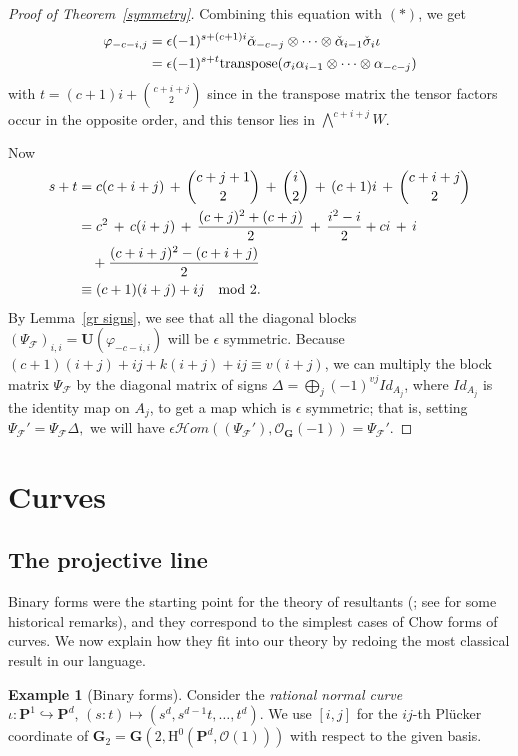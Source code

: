 \documentclass{jams-l}
\theoremstyle{definition}
\newtheorem{example}[theorem]{Example}
\theoremstyle{remark}
\newcommand{\F}{{\mathcal F}}
\newcommand{\GG}{{\mathbf G}}
\newcommand{\Hrm}{{\mathrm H}}
\newcommand{\cH}{{\mathcal H}}
\newcommand{\Ocal}{{\mathcal O}}
\newcommand{\cO}{{\mathcal O}}
\newcommand{\PP}{{\mathbf P}}
\newcommand{\UU}{{\mathbf U}}
\newcommand{\tensor}{\otimes}
\begin{document}
\begin{proof}[Proof of Theorem~\ref{symmetry}]
Combining this equation with $(*)$, we get
\begin{align*}
\varphi_{-c-i,j}
& =\epsilon (-1)^{s+(c+1)i} \check \alpha_{-c-j} \tensor \ldots 
\tensor \check \alpha_{i-1} \check \sigma_i \iota \\
& =\epsilon (-1)^{s+t} {\rm transpose}(\sigma_i \alpha_{i-1} \tensor
\ldots \tensor \alpha_{-c-j}) 
\end{align*}
with $t=(c+1)i+{c+i+j \choose 2}$ since in the transpose matrix the
tensor factors occur in the opposite order, and this tensor lies in
$\bigwedge^{c+i+j} W$.

Now
\begin{align*}
s+t&=c(c+i+j)\,+\,{c+j+1 \choose 2}\,+\,{i \choose 2}\,+\,(c+1)i\,+\,{c+i+j \choose 2} \\
&= c^2\,+\,c(i+j)\,+\,\frac{(c+j)^2+(c+j)}{2}\,+\,\frac{i^2-i}{2}+
ci\,+\,i\, \\
&\quad+\frac{(c+i+j)^2-(c+i+j)}{2} \\
&\equiv (c+1)(i+j)+ij \quad\hbox{mod } 2.
\end{align*}
By Lemma~\ref{gr signs}, we see that all the diagonal
blocks $(\Psi_\F)_{i,i}=\UU(\varphi_{-c-i,i})$
will be $\epsilon$ symmetric. 
Because
$(c+1)(i+j)+ij+k(i+j)+ij \equiv v(i+j)$,
we can multiply the block matrix $\Psi_\F$
by the diagonal matrix of signs
$\Delta=\bigoplus_j(-1)^{vj}Id_{A_j}$,
where $Id_{A_j}$ is the identity map
on $A_j$, to get
a map which is $\epsilon$ symmetric; that is,
setting 
$\Psi_\F'=
\Psi_\F\Delta,
$
we will have
$
\epsilon \cH om((\Psi_\F'),\Ocal_\GG(-1))
=\Psi_\F'.
$
\end{proof}

\section{Curves}\label{curves} 

\subsection*{The projective line} 

Binary forms were the starting point for the theory of resultants
(\cite{Leibniz 1693,Bezout1779,Sylvester 1840--1842};
see \cite{Kline 1972} for some historical remarks), and they
correspond to the simplest cases of Chow forms of curves.  We now
explain how they fit into our theory by redoing the most classical
result in our language.

\begin{example}[Binary forms] \label{binary}
Consider the {\it rational normal curve\/} 
$\iota: \PP^1 \hookrightarrow \PP^d, \, (s:t) \mapsto (s^d,s^{d-1}t,\ldots, t^d)$.
We use 
$[i,j]$ for the $ij$-th Pl\"ucker coordinate of 
$\GG_2=\GG(2,\Hrm^0(\PP^d,\cO(1)))$
with respect to the given basis. 
\end{example}
\end{document}
